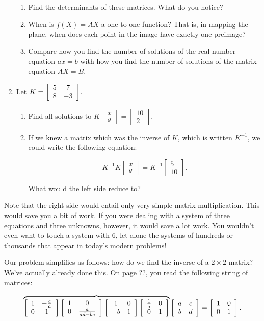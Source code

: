 \documentclass[../gatm.tex]{subfiles}
\begin{document}
\begin{enumerate}
\begin{enumerate}
\item Find the determinants of these matrices. What do you notice?
\item When is $f(X)=AX$ a one-to-one function? That is, in mapping the plane, when does each point in the image have exactly one preimage?
\item Compare how you find the number of solutions of the real number equation $ax=b$ with how you find the number of solutions of the matrix equation $AX=B$.
\end{enumerate}
\item Let $K=\left[\begin{array}{cc} 5 & 7 \\ 8 & -3 \end{array}\right]$.\begin{enumerate}
\item Find all solutions to $K\left[\begin{array}{c} x \\ y \end{array}\right]=\left[\begin{array}{c} 10 \\ 2 \end{array}\right]$.
\item If we knew a matrix which was the inverse of $K$, which is written $K^{-1}$, we could write the following equation:

$$K^{-1}K\left[\begin{array}{c} x \\ y \end{array}\right]=K^{-1}\left[\begin{array}{c} 5 \\ 10 \end{array}\right].$$

What would the left side reduce to?
\end{enumerate}
\end{enumerate}

Note that the right side would entail only very simple matrix multiplication. This would save you a bit of work. If you were dealing with a system of three equations and three unknowns, however, it would save a lot work. You wouldn't even want to touch a system with $6$, let alone the systems of hundreds or thousands that appear in today's modern problems!

Our problem simplifies as follows: how do we find the inverse of a $2\times 2$ matrix? We've actually already done this. On page ??, you read the following string of matrices:

$$\overbrace{\left[\begin{array}{cc} 1 & -\frac{c}{a} \\ 0 & 1 \end{array}\right]\left[\begin{array}{cc} 1 & 0 \\ 0 & \frac{a}{ad-bc} \end{array}\right]\left[\begin{array}{cc} 1 & 0 \\ -b & 1 \end{array}\right]\left[\begin{array}{cc} \frac{1}{a} & 0 \\ 0 & 1 \end{array}\right]}\left[\begin{array}{cc} a & c \\ b & d \end{array}\right]=\left[\begin{array}{cc} 1 & 0 \\ 0 & 1 \end{array}\right].$$
\end{document}
